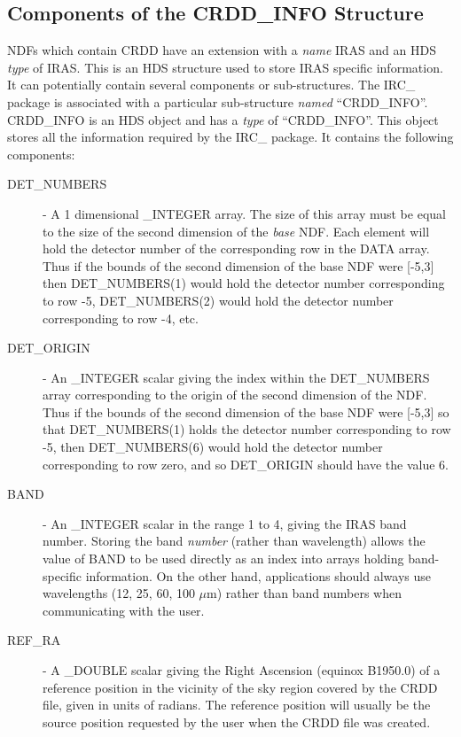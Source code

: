 \subsection {Components of the CRDD\_INFO Structure}
\label{SEC:CRDD_INFO}
NDFs which contain CRDD have an extension with a {\em name} IRAS and
an HDS {\em type} of IRAS. This is an HDS structure used to store IRAS specific
information. It can potentially contain several components or sub-structures.
The IRC\_ package is associated with a particular sub-structure {\em named} 
``CRDD\_INFO''. CRDD\_INFO is an HDS object and has a {\em type} of
``CRDD\_INFO''. This object stores all the information required by the IRC\_
package. It contains the following components: 

\begin {description}

\item [DET\_NUMBERS] - A 1 dimensional \_INTEGER array. The size of this array
must be equal to the size of the second dimension of the {\em base} NDF. Each
element will hold the detector number of the corresponding row in the DATA
array. Thus if the bounds of the second dimension of the base NDF were [-5,3]
then DET\_NUMBERS(1) would hold the detector number corresponding to row -5,
DET\_NUMBERS(2) would hold the detector number corresponding to row -4, etc. 

\item [DET\_ORIGIN] - An \_INTEGER scalar giving the index within the 
DET\_NUMBERS array corresponding to the origin of the second dimension of the 
NDF. Thus if the bounds of the second dimension of the base NDF were [-5,3]
so that DET\_NUMBERS(1) holds the detector number corresponding to row -5, then
DET\_NUMBERS(6) would hold the detector number corresponding to row zero, and
so DET\_ORIGIN should have the value 6.

\item [BAND] - An \_INTEGER scalar in the range 1 to 4, giving the IRAS band 
number. Storing the band {\em number} (rather than wavelength) allows the
value of BAND to be used directly as an index into arrays holding band-specific 
information. On the other hand, applications should always use wavelengths
(12, 25, 60, 100 $\mu$m) rather than band numbers when communicating with the user.

\item [REF\_RA] - A \_DOUBLE scalar giving the Right Ascension (equinox B1950.0)
of a reference position in the vicinity of the sky region covered by the CRDD
file, given in units of radians. The reference position will usually be the
source position requested by the user when the CRDD file was created. 


\end{description}

